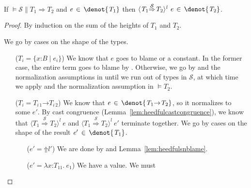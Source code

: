 \documentclass[9pt]{extarticle}
\newcommand{\ottnt}[1]{\mathit{#1}}
\newcommand{\ottmv}[1]{\mathit{#1}}
\newcommand{\ottsym}[1]{#1}
\begin{document}
{\begin{lemma}
  \label{lem:heedfulsncast}
  If $\models  \mathcal{S}  \mathrel{\parallel}  \ottnt{T_{{\mathrm{1}}}}  \Rightarrow  \ottnt{T_{{\mathrm{2}}}}$ and $\ottnt{e} \, \in \,  \denot{ \ottnt{T_{{\mathrm{1}}}} } $ then $ \langle  \ottnt{T_{{\mathrm{1}}}}  \mathord{ \overset{ \mathcal{S} }{\Rightarrow} }  \ottnt{T_{{\mathrm{2}}}}  \rangle^{ \ottnt{l} } ~  \ottnt{e}  \, \in \,  \denot{ \ottnt{T_{{\mathrm{2}}}} } $.
\begin{proof}
    By induction on the sum of the heights of $\ottnt{T_{{\mathrm{1}}}}$ and $\ottnt{T_{{\mathrm{2}}}}$.
    {\iffull
    We go by cases on the shape of the types.
\begin{itemize}
    \item[($\ottnt{T_{\ottmv{i}}}  \ottsym{=}   \{ \mathit{x} \mathord{:} \ottnt{B} \mathrel{\mid} \ottnt{e_{\ottmv{i}}} \} $)] We know that $\ottnt{e}$ goes to blame or a
      constant. In the former case, the entire term goes to blame by
      . Otherwise, we go by  and the
      normalization assumptions in  until we run out of
      types in $\mathcal{S}$, at which time we apply  and the
      normalization assumption in $\models  \ottnt{T_{{\mathrm{2}}}}$.
    \item[($\ottnt{T_{\ottmv{i}}}  \ottsym{=}   \ottnt{T_{\ottmv{i}\,{\mathrm{1}}}} \mathord{ \rightarrow } \ottnt{T_{\ottmv{i}\,{\mathrm{2}}}} $)] We know that $\ottnt{e} \, \in \,  \denot{  \ottnt{T_{{\mathrm{1}}}} \mathord{ \rightarrow } \ottnt{T_{{\mathrm{2}}}}  } $, so
      it normalizes to some $\ottnt{e'}$. By cast congruence
      (Lemma~\ref{lem:heedfulcastcongruence}), we know that $ \langle  \ottnt{T_{{\mathrm{1}}}}  \mathord{ \overset{ \mathcal{S} }{\Rightarrow} }  \ottnt{T_{{\mathrm{2}}}}  \rangle^{ \ottnt{l} } ~  \ottnt{e} $ and $ \langle  \ottnt{T_{{\mathrm{1}}}}  \mathord{ \overset{ \mathcal{S} }{\Rightarrow} }  \ottnt{T_{{\mathrm{2}}}}  \rangle^{ \ottnt{l} } ~  \ottnt{e'} $ terminate together.
We go by cases on the shape of the result $\ottnt{e'} \, \in \,  \denot{ \ottnt{T_{{\mathrm{1}}}} } $.
\begin{itemize}
      \item[($\ottnt{e'}  \ottsym{=}   \mathord{\Uparrow}  \ottnt{l'} $)] We are done by  and
        Lemma~\ref{lem:heedfulsnblame}.
      \item[($\ottnt{e'}  \ottsym{=}   \lambda \mathit{x} \mathord{:} \ottnt{T_{{\mathrm{11}}}} .~  \ottnt{e_{{\mathrm{1}}}} $)] We have a value. We must

\end{itemize}
\end{itemize}}
\end{proof}
\end{lemma}}
\end{document}

